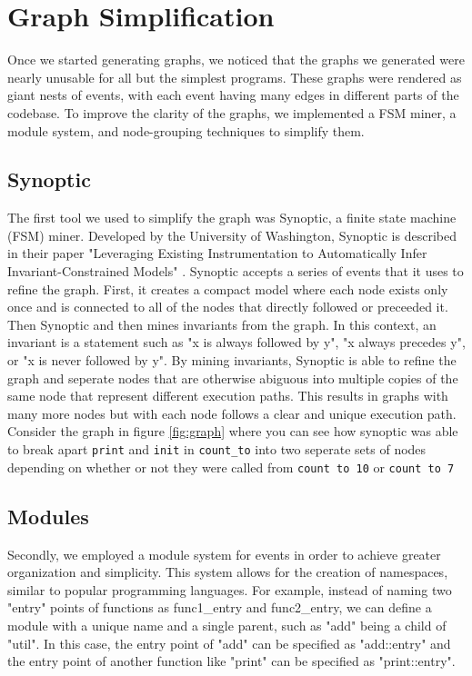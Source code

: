 \chapter{Graph Simplification}
Once we started generating graphs, we noticed that the graphs we generated were nearly unusable for all but the simplest programs. These graphs were rendered as giant nests of events, with each event having many edges in different parts of the codebase. To improve the clarity of the graphs, we implemented a FSM miner, a module system, and node-grouping techniques to simplify them.

\section{Synoptic}
The first tool we used to simplify the graph was Synoptic, a finite state machine (FSM) miner. Developed by the University of Washington, Synoptic is described in their paper "Leveraging Existing Instrumentation to Automatically Infer Invariant-Constrained Models" \cite{synoptic}. Synoptic accepts a series of events that it uses to refine the graph. First, it creates a compact model where each node exists only once and is connected to all of the nodes that directly followed or preceeded it. Then Synoptic and then mines invariants from the graph. In this context, an invariant is a statement such as "x is always followed by y", "x always precedes y", or "x is never followed by y". By mining invariants, Synoptic is able to refine the graph and seperate nodes that are otherwise abiguous into multiple copies of the same node that represent different execution paths. This results in graphs with many more nodes but with each node follows a clear and unique execution path. Consider the graph in figure \ref{fig:graph} where you can see how synoptic was able to break apart \texttt{print} and \texttt{init} in \texttt{count\_to} into two seperate sets of nodes depending on whether or not they were called from \texttt{count to 10} or \texttt{count to 7}

\section{Modules}
\label{sec:modules}
Secondly, we employed a module system for events in order to achieve greater organization and simplicity. This system allows for the creation of namespaces, similar to popular programming languages. For example, instead of naming two "entry" points of functions as func1\_entry and func2\_entry, we can define a module with a unique name and a single parent, such as "add" being a child of "util". In this case, the entry point of "add" can be specified as "add::entry" and the entry point of another function like "print" can be specified as "print::entry".

